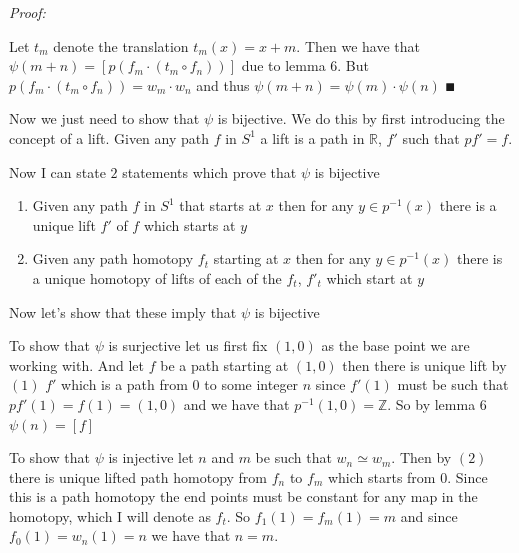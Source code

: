\documentclass[paper=a4,fontsize=paper,12.5pt]{book}
\newcommand{\3}{\vspace*{3mm}}
\newcommand{\Proof}{\textit{Proof:}}
\newcommand{\Z}{\mathbb{Z}}
\newcommand{\R}{\mathbb{R}}
\newcommand{\C}[1]{{S}^{#1}}
\begin{document}
\Proof

Let ${t}_{m}$ denote the translation ${t}_{m}(x) = x + m$. Then we have that $\psi(m+n) = [p({f}_{m} \cdot ( {t}_{m} \circ {f}_{n}))]$ due to lemma $6$. But $p({f}_{m} \cdot ( {t}_{m} \circ {f}_{n})) = {w}_{m} \cdot {w}_{n}$ and thus $\psi(m+n) = \psi(m) \cdot \psi(n)$ $\QED$


\newpage

Now we just need to show that $\psi$ is bijective. We do this by first introducing the concept of a lift. Given any path $f$ in $\C{1}$ a lift is a path in $\R$, $f'$ such that $pf' = f$.

\3

Now I can state $2$ statements which prove that $\psi$ is bijective

\begin{enumerate}

\item Given any path $f$ in $\C{1}$ that starts at $x$ then for any $y \in {p}^{-1}(x)$ there is a unique lift $f'$ of $f$ which starts at $y$

\item Given any path homotopy ${f}_{t}$ starting at $x$ then for any $y \in {p}^{-1}(x)$ there is a unique homotopy of lifts of each of the ${f}_{t}$, ${f'}_{t}$ which start at $y$

\end{enumerate}

\3

Now let's show that these imply that $\psi$ is bijective

\3

To show that $\psi$ is surjective let us first fix $(1,0)$ as the base point we are working with. And let $f$ be a path starting at $(1,0)$ then there is unique lift by $(1)$ $f'$ which is a path from $0$ to some integer $n$ since $f'(1)$ must be such that $pf'(1) = f(1) = (1,0)$ and we have that $ {p}^{-1}(1,0) = \Z$. So by lemma $6$ $\psi(n) = [f]$

\3

To show that $\psi$ is injective let $n$ and $m$ be such that ${w}_{n} \simeq {w}_{m}$. Then by $(2)$ there is unique lifted path homotopy from ${f}_{n}$ to ${f}_{m}$ which starts from $0$. Since this is a path homotopy the end points must be constant for any map in the homotopy, which I will denote as ${f}_{t}$. So ${f}_{1}(1) = {f}_{m}(1) = m$ and since ${f}_{0}(1) = {w}_{n}(1) = n$ we have that $n = m$.

\3
\end{document}
